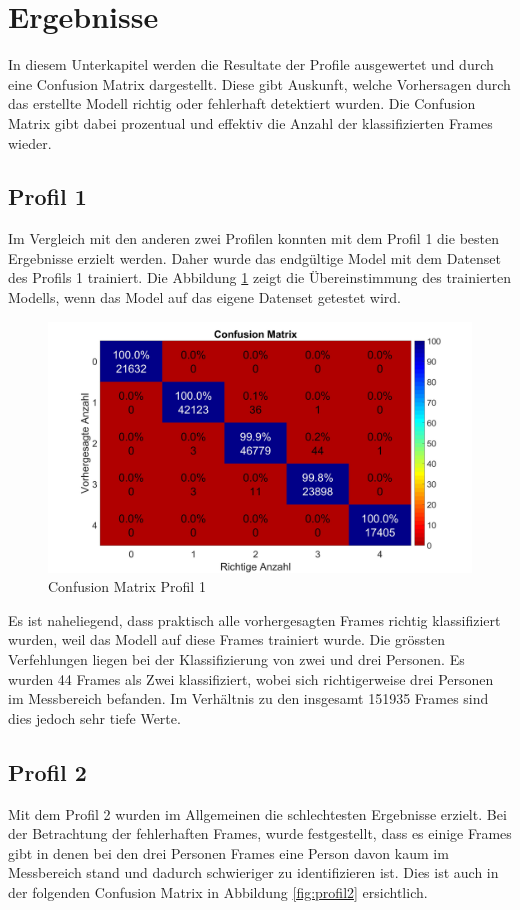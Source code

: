 \section{Ergebnisse}
\label{sec:Ergebnisse}

In diesem Unterkapitel werden die Resultate der Profile ausgewertet und durch eine Confusion Matrix dargestellt. Diese gibt Auskunft, welche Vorhersagen durch das erstellte Modell richtig oder fehlerhaft detektiert wurden. Die Confusion Matrix gibt dabei prozentual und effektiv die Anzahl der klassifizierten Frames wieder. 


\subsection{Profil 1}
\label{subsec:Profil1}
Im Vergleich mit den anderen zwei Profilen konnten mit dem Profil 1 die besten Ergebnisse erzielt werden. Daher wurde das endgültige Model mit dem Datenset des Profils 1 trainiert. Die Abbildung \ref{fig:profil1} zeigt die Übereinstimmung des trainierten Modells, wenn das Model auf das eigene Datenset getestet wird. 


\begin{figure}[H]
	\centering
	\label{fig:profil1}
	\includegraphics[width=0.55\linewidth]{fig/Profil_1m}
	\caption[Confusion Matrix Profil 1]{Confusion Matrix Profil 1}

\end{figure}

 Es ist naheliegend, dass praktisch alle vorhergesagten Frames richtig klassifiziert wurden, weil das Modell auf diese Frames trainiert wurde. Die grössten Verfehlungen liegen bei der Klassifizierung von zwei und drei Personen. Es wurden 44 Frames als Zwei klassifiziert, wobei sich richtigerweise drei Personen im Messbereich befanden. Im Verhältnis zu den insgesamt 151935 Frames sind dies jedoch sehr tiefe Werte.

\subsection{Profil 2}
\label{subsec:Profil2}
Mit dem Profil 2 wurden im Allgemeinen die schlechtesten Ergebnisse erzielt. Bei der Betrachtung der fehlerhaften Frames, wurde festgestellt, dass es einige Frames gibt in denen bei den drei Personen Frames eine Person davon kaum im Messbereich stand und dadurch schwieriger zu identifizieren ist. Dies ist auch in der folgenden Confusion Matrix in Abbildung \ref{fig:profil2} ersichtlich.

